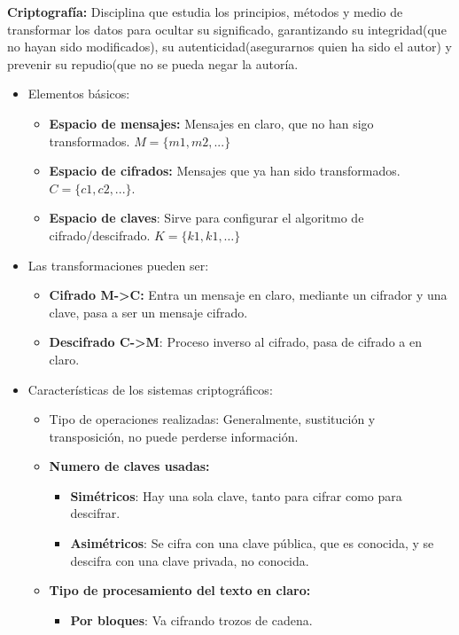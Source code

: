 \documentclass[12pt, twoside, openright]{report} %
\begin{document}
\textbf{Criptografía:} Disciplina que estudia los principios, métodos y medio de transformar los datos para ocultar su significado, garantizando su integridad(que no hayan sido modificados), su autenticidad(asegurarnos quien ha sido el autor) y prevenir su repudio(que no se pueda negar la autoría.
\begin{itemize}
	\item Elementos básicos:
	      \begin{itemize}
		      \item \textbf{Espacio de mensajes:} Mensajes en claro, que no han sigo transformados. $M=\{m1,m2,...\}$
		      \item \textbf{Espacio de cifrados:} Mensajes que ya han sido transformados. $C=\{c1,c2,...\}$.
		      \item \textbf{Espacio de claves}: Sirve para configurar el algoritmo de cifrado/descifrado. $K=\{k1,k1,\ldots\}$
	      \end{itemize}
	\item Las transformaciones pueden ser:
	      \begin{itemize}
		      \item \textbf{Cifrado M-\textgreater C:} Entra un mensaje en claro, mediante un cifrador y una clave, pasa a ser un mensaje cifrado.
		      \item \textbf{Descifrado C-\textgreater M}: Proceso inverso al cifrado, pasa de cifrado a en claro.
	      \end{itemize}
	\item Características de los sistemas criptográficos:
	      \begin{itemize}
		      \item Tipo de operaciones realizadas: Generalmente, sustitución y transposición, no puede perderse información.
		      \item \textbf{Numero de claves usadas:}
		            \begin{itemize}
			            \item \textbf{Simétricos}: Hay una sola clave, tanto para cifrar como para descifrar.
			            \item \textbf{Asimétricos}: Se cifra con una clave pública, que es conocida, y se descifra con una clave privada, no conocida.
		            \end{itemize}
		      \item \textbf{Tipo de procesamiento del texto en claro:}
		            \begin{itemize}
			            \item \textbf{Por bloques}: Va cifrando trozos de cadena.

\end{itemize}
\end{itemize}
\end{itemize}
\end{document}
